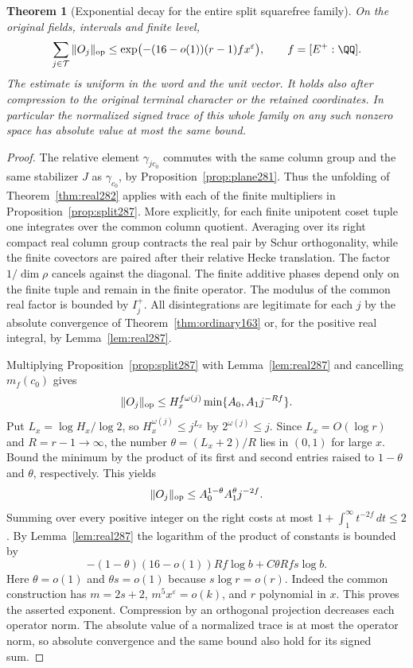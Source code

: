 \documentclass[a4paper,11pt]{article}
\newtheorem{theorem}[proposition]{Theorem}
\theoremstyle{definition}
\theoremstyle{remark}
\numberwithin{equation}{section}
\begin{document}
\begin{theorem}[Exponential decay for the entire split squarefree family]\leavevmode
\label{thm:sum287}
On the original fields, intervals and finite level,
\[
       \sum_{j\in\mathcal T}\|O_j\|_{\rm op}
          \le \exp\bigl(-(16-o(1))(r-1)f x^\varepsilon\bigr),
                \qquad f=[E^+:\QQ] .
\]
The estimate is uniform in the word and the unit vector.
It holds also after compression to the original terminal
character or the retained coordinates. In particular the
normalized signed trace of this whole family on any such
nonzero space has absolute value at most the same bound.
\end{theorem}
\begin{proof}
The relative element \(\gamma_{j c_0}\) commutes with the
same column group and the same stabilizer \(J\) as
\(\gamma_{c_0}\), by Proposition~\ref{prop:plane281}.
Thus the unfolding of Theorem~\ref{thm:real282} applies
with each of the finite multipliers in
Proposition~\ref{prop:split287}. More explicitly, for
each finite unipotent coset tuple one integrates over
the common column quotient. Averaging over its right compact
real column group contracts the real pair by Schur orthogonality,
while the finite covectors are paired after their relative
Hecke translation. The factor \(1/\dim\rho\) cancels against
the diagonal. The finite additive phases depend only on the
finite tuple and remain in the finite operator. The modulus
of the common real factor is bounded by \(I_j^+\).
All disintegrations are legitimate for each \(j\) by the
absolute convergence of Theorem~\ref{thm:ordinary163} or,
for the positive real integral, by Lemma~\ref{lem:real287}.

Multiplying Proposition~\ref{prop:split287} with
Lemma~\ref{lem:real287} and cancelling \(m_f(c_0)\) gives
\[
       \|O_j\|_{\rm op}\le H_x^{f\omega(j)}
                    \min\{A_0,A_1j^{-Rf}\}.
\]
Put \(L_x=\log H_x/\log 2\), so \(H_x^{\omega(j)}\le j^{L_x}\)
by \(2^{\omega(j)}\le j\). Since \(L_x=O(\log r)\) and
\(R=r-1\to\infty\), the number \(\theta=(L_x+2)/R\)
lies in \((0,1)\) for large \(x\). Bound the minimum by
the product of its first and second entries raised to
\(1-\theta\) and \(\theta\), respectively. This yields
\[
        \|O_j\|_{\rm op}
           \le A_0^{1-\theta}A_1^\theta j^{-2f}.
\]
Summing over every positive integer on the right costs at
most \(1+\int_1^\infty t^{-2f}\,dt\le2\).
By Lemma~\ref{lem:real287} the logarithm of the product
of constants is bounded by
\[
 -(1-\theta)(16-o(1))Rf\log b + C\theta Rfs\log b.
\]
Here \(\theta=o(1)\) and \(\theta s=o(1)\) because
\(s\log r=o(r)\). Indeed the common construction has
\(m=2s+2\), \(m^5x^\varepsilon=o(k)\), and \(r\) polynomial
in \(x\). This proves the asserted exponent. Compression
by an orthogonal projection decreases each operator norm.
The absolute value of a normalized trace is at most the
operator norm, so absolute convergence and the same bound
also hold for its signed sum.
\end{proof}
\end{document}
